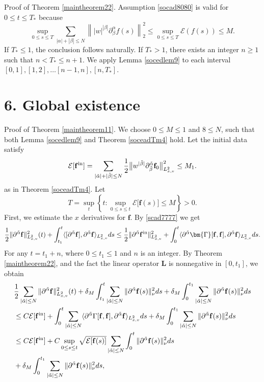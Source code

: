 \documentclass[reqno]{amsart}
\numberwithin{equation}{section}
\numberwithin{equation}{section}
\begin{document}
		Proof of Theorem \ref{maintheorem22}. Assumption \eqref{socad8080} is valid for $0 \le t \le T_{*}$ because 
		$$
		\sup_{0 \le s \le T} \sum_{|\alpha| + |\beta| \le N} \left\| |w|^{|\beta|} \partial_\beta^\alpha f(s) \right\|_2^2 \le \sup_{0 \le s \le T} \mathcal{E}(f(s)) \le M.
		$$
		If $T_{*}\leq 1$, the conclusion follows naturally.
		If $T_{*}> 1$, there exists an integer $n \geq 1$ such that $n< T_{*}\leq n+1$. We apply Lemma \ref{socedlem9} to each interval $[0,  1],[1,  2],\ldots [n-1, n], [n, T_*]$. 
		\section*{6. Global existence}
		
		Proof of Theorem \ref{maintheorem11}. We choose $0 \le M \le 1$ and $ 8 \leq N$, such that both Lemma \ref{socedlem9} and Theorem \ref{soceadTm4} hold. Let the initial data satisfy
		\begin{equation*}
			\mathcal{E}[\mathbf{f}^{\rm{in}}] = \sum_{|\tilde{\alpha}|+|\tilde{\beta}|\leq N}  \frac{1}{2} \big\| w^{|\tilde{\beta}|} \partial_{\tilde{\beta}}^{\tilde{\alpha}} \mathbf{f}_0 \big\|^2_{L^{2}_{x,v}}\leq M_1. 
		\end{equation*}
		as in Theorem \ref{soceadTm4}. Let
		$$
		T = \sup_t \left\{ t : \sup_{0 \le s \le t} \mathcal{E}\big[\mathbf{f}(s)\big] \le M \right\} > 0.
		$$
		First, we estimate the $ x $ derivatives for $ \mathbf{f} $. By \eqref{scad7777} we get
		$$
		\frac{1}{2}\|\partial^{\tilde{\alpha}} \mathbf{f}\|^2_{L^{2}_{x,v}}(t) + \int_{t_1}^t \langle [\partial^{\tilde{\alpha}} \mathbf{f}], \partial^{\tilde{\alpha}} \mathbf{f} \rangle_{L^{2}_{x,v}} ds \leq \frac{1}{2}\|\partial^{\tilde{\alpha}} \mathbf{f}^{\rm{in}}\|^2_{L^{2}_{x,v}} + \int_{0}^t \langle \partial^{\tilde{\alpha}} \bm{\Gamma}[\mathbf{f}, \mathbf{f}], \partial^{\tilde{\alpha}} \mathbf{f} \rangle_{L^{2}_{x,v}} ds.
		$$
		For any $ t = t_1 + n $, where $ 0 \le t_1 \le 1 $ and $ n $ is an integer. By Theorem \ref{maintheorem22}, and the fact the linear operator $\mathbf{L}$ is nonnegative in $[0, t_1]$, we obtain
		\begin{align*}
			&\frac{1}{2}\sum_{|\tilde{\alpha}| \leq N}\|\partial^{\tilde{\alpha}} \mathbf{f}\|^2_{L^{2}_{x,v}}(t) + \delta_M \int_{t_1}^t \sum_{|\tilde{\alpha}| \leq N}\|\partial^{\tilde{\alpha}} \mathbf{f}(s)\|_{\nu}^2 ds + \delta_M \int_{0}^{t_1} \sum_{|\tilde{\alpha}| \leq N}\|\partial^{\tilde{\alpha}} \mathbf{f}(s)\|_{\nu}^2 ds \\
			&\leq C\mathcal{E}[\mathbf{f}^{\rm{in}}] + \int_{0}^t \sum_{|\tilde{\alpha}| \leq N}\langle \partial^{\tilde{\alpha}} \Gamma[\mathbf{f}, \mathbf{f}], \partial^{\tilde{\alpha}} \mathbf{f} \rangle_{L^{2}_{x,v}} ds + \delta_M \int_{0}^{t_1} \sum_{|\tilde{\alpha}| \leq N}\|\partial^{\tilde{\alpha}} \mathbf{f}(s)\|_{\nu}^2 ds \\
			&\leq C\mathcal{E}[\mathbf{f}^{\rm{in}}] + C \sup_{0 \leq s \leq t} \sqrt{\mathcal{E}[\mathbf{f}(s)]} \sum_{|\tilde{\alpha}| \leq N} \int_{0}^t \|\partial^{\tilde{\alpha}} \mathbf{f}(s)\|_{\nu}^2 ds \\
			&+ \delta_M \int_{0}^{t_1} \sum_{|\tilde{\alpha}| \leq N}\|\partial^{\tilde{\alpha}} \mathbf{f}(s)\|_{\nu}^2 ds,
		\end{align*}
\end{document}
